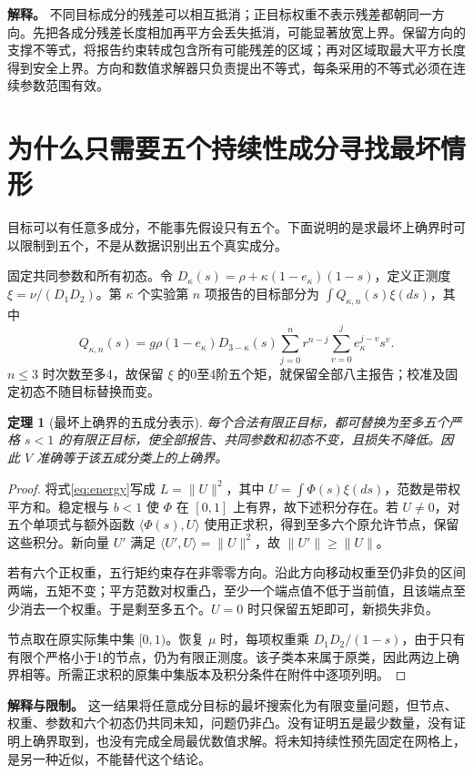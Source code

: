\documentclass[UTF8,fontset=windows,11pt,a4paper]{ctexart}
\newtheorem{theorem}{定理}
\numberwithin{equation}{section}
\begin{document}
\noindent\textbf{解释。}
不同目标成分的残差可以相互抵消；正目标权重不表示残差都朝同一方向。先把各成分残差长度相加再平方会丢失抵消，可能显著放宽上界。保留方向的支撑不等式，将报告约束转成包含所有可能残差的区域；再对区域取最大平方长度得到安全上界。方向和数值求解器只负责提出不等式，每条采用的不等式必须在连续参数范围有效。

\section{为什么只需要五个持续性成分寻找最坏情形}
目标可以有任意多成分，不能事先假设只有五个。下面说明的是求最坏上确界时可以限制到五个，不是从数据识别出五个真实成分。

固定共同参数和所有初态。令 $D_\kappa(s)=\rho+\kappa(1-e_\kappa)(1-s)$，定义正测度 $\xi=\nu/(D_1D_2)$。第 $\kappa$ 个实验第 $n$ 项报告的目标部分为 $\int Q_{\kappa,n}(s)\xi(ds)$，其中
\begin{equation}
 Q_{\kappa,n}(s)=g\rho(1-e_\kappa)D_{3-\kappa}(s)
 \sum_{j=0}^{n}r^{n-j}\sum_{v=0}^{j}e_\kappa^{j-v}s^v.
\end{equation}
$n\le3$ 时次数至多4，故保留 $\xi$ 的0至4阶五个矩，就保留全部八主报告；校准及固定初态不随目标替换而变。

\begin{theorem}[最坏上确界的五成分表示]\label{thm:five}
每个合法有限正目标，都可替换为至多五个严格 $s<1$ 的有限正目标，使全部报告、共同参数和初态不变，且损失不降低。因此 $V$ 准确等于该五成分类上的上确界。
\end{theorem}
\begin{proof}
将式\eqref{eq:energy}写成 $L=\|U\|^2$，其中 $U=\int\Phi(s)\xi(ds)$，范数是带权平方和。稳定根与 $b<1$ 使 $\Phi$ 在 $[0,1]$ 上有界，故下述积分存在。若 $U\ne0$，对五个单项式与额外函数 $\langle\Phi(s),U\rangle$ 使用正求积\cite{bt}，得到至多六个原允许节点，保留这些积分。新向量 $U'$ 满足 $\langle U',U\rangle=\|U\|^2$，故 $\|U'\|\ge\|U\|$。

若有六个正权重，五行矩约束存在非零零方向。沿此方向移动权重至仍非负的区间两端，五矩不变；平方范数对权重凸，至少一个端点值不低于当前值，且该端点至少消去一个权重。于是剩至多五个。$U=0$ 时只保留五矩即可，新损失非负。

节点取在原实际集中集 $[0,1)$。恢复 $\mu$ 时，每项权重乘 $D_1D_2/(1-s)$，由于只有有限个严格小于1的节点，仍为有限正测度。该子类本来属于原类，因此两边上确界相等。所需正求积的原集中集版本及积分条件在附件中逐项列明。
\end{proof}

\noindent\textbf{解释与限制。}
这一结果将任意成分目标的最坏搜索化为有限变量问题，但节点、权重、参数和六个初态仍共同未知，问题仍非凸。没有证明五是最少数量，没有证明上确界取到，也没有完成全局最优数值求解。将未知持续性预先固定在网格上，是另一种近似，不能替代这个结论。
\end{document}
